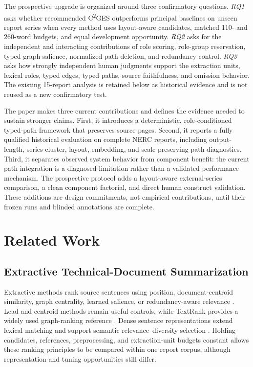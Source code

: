 \documentclass[applsci,article,submit,moreauthors]{Definitions/mdpi}
\newcommand{\cges}{C\textsuperscript{2}GES}
\begin{document}
The prospective upgrade is organized around three confirmatory questions. \textit{RQ1} asks whether recommended \cges{} outperforms principal baselines on unseen report series when every method uses layout-aware candidates, matched 110- and 260-word budgets, and equal development opportunity. \textit{RQ2} asks for the independent and interacting contributions of role scoring, role-group reservation, typed graph salience, normalized path deletion, and redundancy control. \textit{RQ3} asks how strongly independent human judgments support the extraction units, lexical roles, typed edges, typed paths, source faithfulness, and omission behavior. The existing 15-report analysis is retained below as historical evidence and is not reused as a new confirmatory test.

The paper makes three current contributions and defines the evidence needed to sustain stronger claims. First, it introduces a deterministic, role-conditioned typed-path framework that preserves source pages. Second, it reports a fully qualified historical evaluation on complete NERC reports, including output-length, series-cluster, layout, embedding, and scale-preserving path diagnostics. Third, it separates observed system behavior from component benefit: the current path integration is a diagnosed limitation rather than a validated performance mechanism. The prospective protocol adds a layout-aware external-series comparison, a clean component factorial, and direct human construct validation. These additions are design commitments, not empirical contributions, until their frozen runs and blinded annotations are complete.

\section{Related Work}

\subsection{Extractive Technical-Document Summarization}

Extractive methods rank source sentences using position, document-centroid similarity, graph centrality, learned salience, or redundancy-aware relevance \cite{zhong2020extractive,bi2021aredsum,liu2021unsupervised}. Lead and centroid methods remain useful controls, while TextRank provides a widely used graph-ranking reference \cite{mihalcea2004textrank}. Dense sentence representations extend lexical matching and support semantic relevance--diversity selection \cite{reimers2019sentencebert}. Holding candidates, references, preprocessing, and extraction-unit budgets constant allows these ranking principles to be compared within one report corpus, although representation and tuning opportunities still differ.
\end{document}
